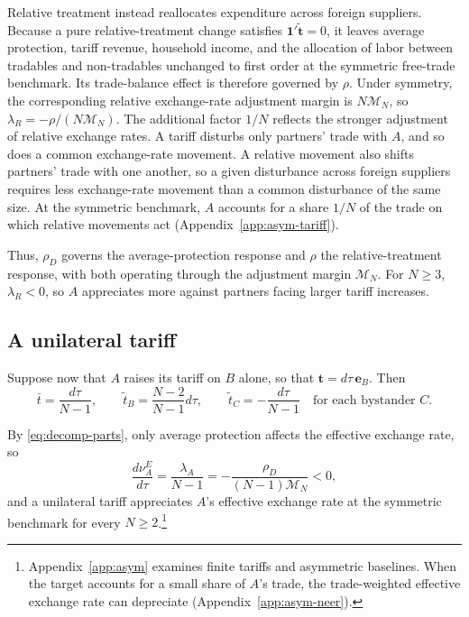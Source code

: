 \documentclass[11pt]{article}
\begin{document}
Relative treatment instead reallocates expenditure across foreign suppliers. Because a pure relative-treatment change satisfies $\mathbf 1'\widetilde{\mathbf t}=0$, it leaves average protection, tariff revenue, household income, and the allocation of labor between tradables and non-tradables unchanged to first order at the symmetric free-trade benchmark. Its trade-balance effect is therefore governed by $\rho$. Under symmetry, the corresponding relative exchange-rate adjustment margin is $N\mathcal M_N$, so $\lambda_R=-\rho/(N\mathcal M_N)$. The additional factor $1/N$ reflects the stronger adjustment of relative exchange rates. A tariff disturbs only partners' trade with $A$, and so does a common exchange-rate movement. A relative movement also shifts partners' trade with one another, so a given disturbance across foreign suppliers requires less exchange-rate movement than a common disturbance of the same size. At the symmetric benchmark, $A$ accounts for a share $1/N$ of the trade on which relative movements act (Appendix~\ref{app:asym-tariff}).

Thus, $\rho_D$ governs the average-protection response and $\rho$ the relative-treatment response, with both operating through the adjustment margin $\mathcal M_N$. For $N\geq3$, $\lambda_R<0$, so $A$ appreciates more against partners facing larger tariff increases.

\subsection{A unilateral tariff}
\label{sec:unilateral}

Suppose now that $A$ raises its tariff on $B$ alone, so that $\mathbf t=d\tau\,\mathbf e_B$. Then
\begin{equation*}
\bar t=\frac{d\tau}{N-1}, \qquad
\tilde t_B=\frac{N-2}{N-1}d\tau, \qquad
\tilde t_C=-\frac{d\tau}{N-1}
\quad\text{for each bystander }C.
\end{equation*}

By \eqref{eq:decomp-parts}, only average protection affects the effective exchange rate, so
\begin{equation}
\frac{d\nu_A^E}{d\tau}
=\frac{\lambda_A}{N-1}
=-\frac{\rho_D}{(N-1)\mathcal M_N}<0,
\label{eq:N-neer}
\end{equation}
and a unilateral tariff appreciates $A$'s effective exchange rate at the symmetric benchmark for every $N\geq2$.\footnote{Appendix~\ref{app:asym} examines finite tariffs and asymmetric baselines. When the target accounts for a small share of $A$'s trade, the trade-weighted effective exchange rate can depreciate (Appendix~\ref{app:asym-neer}).}
\end{document}
